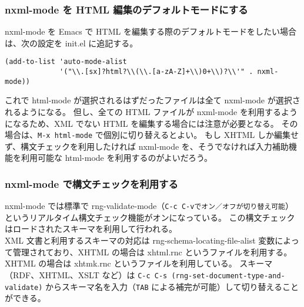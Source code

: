 \subsubsection{nxml-mode を HTML 編集のデフォルトモードにする}
nxml-mode を Emacs で HTML を編集する際のデフォルトモードをしたい場合は、次の設定を init.el に追記する。
\begin{mdframed}[roundcorner=0.50zw,leftmargin=3.00zw,rightmargin=3.00zw,skipabove=0.40zw,skipbelow=0.40zw,innertopmargin=4.00pt,innerbottommargin=4.00pt,innerleftmargin=5.00pt,innerrightmargin=5.00pt,linecolor=gray!020,linewidth=0.50pt,backgroundcolor=gray!20]
\begin{verbatim}
(add-to-list 'auto-mode-alist
             '("\\.[sx]?html?\\(\\.[a-zA-Z]+\\)0+\\)?\\'" . nxml-mode))
\end{verbatim}
\end{mdframed}
これで html-mode が選択されるはずだったファイルは全て nxml-mode が選択されるようになる。
但し、全ての HTML ファイルが nxml-mode を利用するようになるため、XML でない HTML を編集する場合には注意が必要となる。
その場合は、\texttt{M-x html-mode} で個別に切り替えるとよい。
もし XHTML しか編集せず、構文チェックを利用したければ nxml-mode を、そうでなければ入力補助機能を利用可能な html-mode を利用するのがよいだろう。
\subsubsection{nxml-mode で構文チェックを利用する}
nxml-mode では標準で rng-validate-mode（\texttt{C-c C-v\hspc{1.00pt}でオン／オフが切り替え可能}）というリアルタイム構文チェック機能がオンになっている。
この構文チェックはロードされたスキーマを利用して行われる。\\

XML 文書と利用するスキーマの対応は rng-schema-locating-file-alist 変数によって管理されており、XHTML の場合は xhtml.rnc というファイルを利用する。
XHTML の場合は xhtmk.rnc というファイルを利用している。
スキーマ（RDF、XHTML、XSLT など）は \texttt{C-c C-s (rng-set-document-type-and-validate)} からスキーマ名を入力（\texttt{TAB} による補完が可能）して切り替えることができる。\\

